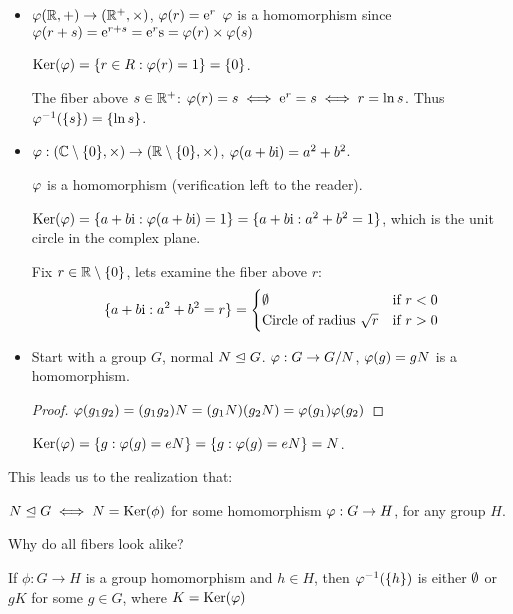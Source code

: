 \documentclass[notes.tex]{subfiles}
\begin{document}
\begin{eg}\leavevmode
\begin{itemize}
	\item $\varphi(\mathbb{R}, +)\to(\mathbb{R}^+, \times)$, $\varphi(r) = \mathrm{e}^r$
	$\varphi$ is a homomorphism since $\varphi(r+s) = \mathrm{e}^{r+s} = \mathrm{e}^r\mathrm{s} = \varphi(r)\times \varphi(s)$

	$\operatorname{\mathrm{Ker}}(\varphi) = \{r\in R : \varphi(r) = 1\} = \{0\}$.

	The fiber above $s\in \mathbb{R}^+$: 
		$\varphi(r) = s \iff \mathrm{e}^r=s \iff r = \ln s$. Thus ${\varphi}^{-1}(\{s\}) = \{\ln s\}$.

	\item $\varphi:(\mathbb{C}\setminus\{0\}, \times)\to(\mathbb{R}\setminus\{0\}, \times)$,
		$\varphi(a+b\mathrm{i}) = a^2 + b^2$.

		$\varphi$ is a homomorphism (verification left to the reader).

		$\operatorname{\mathrm{Ker}}(\varphi) = \{a+b\mathrm{i} : \varphi(a+b\mathrm{i}) = 1\} = \{a+b\mathrm{i} : a^2 + b^2 = 1\}$,
		which is the unit circle in the complex plane.

		Fix $r\in\mathbb{R}\setminus\{0\}$, lets examine the fiber above $r$:
		\[
		\{a+b\mathrm{i} : a^2 + b^2 = r\} = 
		\begin{cases}
			\emptyset &\text{if } r < 0\\
			\text{Circle of radius }\sqrt{r}&\text{if } r > 0
		\end{cases}
		\]
	\item Start with a group $G$, normal $N\trianglelefteq G$.
		$\varphi:G\to G/N$, $\varphi(g) = gN$ is a homomorphism.

		\begin{proof}
			$\varphi(g_1g_2) = (g_1g_2)N = (g_1N)(g_2N) = \varphi(g_1)\varphi(g_2)$
		\end{proof}

		$\operatorname{\mathrm{Ker}}(\varphi) = \{g:\varphi(g) = eN\} = \{g:\varphi(g) = eN\} = N$.
\end{itemize} 
\end{eg}

This leads us to the realization that:
\begin{proposition}
	$N\trianglelefteq G \iff N = \operatorname{\mathrm{Ker}}(\phi)$
	for some homomorphism $\varphi:G\to H$, for any group $H$.
\end{proposition}

Why do all fibers look alike?

\begin{proposition}
	If $\phi:G\to H$ is a group homomorphism and $h\in H$,
	then ${\varphi}^{-1}(\{h\})$ is either $\emptyset$ or $gK$ for some $g\in G$, where $K = \operatorname{\mathrm{Ker}}(\varphi)$
\end{proposition}
\end{document}
